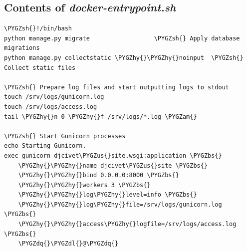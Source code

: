 \documentclass[letterpaper,10pt,english]{sphinxmanual}
\def\PYGZbs{\char`\\}
\def\PYGZus{\char`\_}
\def\PYGZam{\char`\&}
\def\PYGZsh{\char`\#}
\def\PYGZdl{\char`\$}
\def\PYGZhy{\char`\-}
\def\PYGZdq{\char`\"}
\begin{document}
\subsection{Contents of \emph{docker-entrypoint.sh}}
\label{appendix5:contents-of-docker-entrypoint-sh}
\begin{Verbatim}[commandchars=\\\{\}]
\PYGZsh{}!/bin/bash
python manage.py migrate                  \PYGZsh{} Apply database migrations
python manage.py collectstatic \PYGZhy{}\PYGZhy{}noinput  \PYGZsh{} Collect static files

\PYGZsh{} Prepare log files and start outputting logs to stdout
touch /srv/logs/gunicorn.log
touch /srv/logs/access.log
tail \PYGZhy{}n 0 \PYGZhy{}f /srv/logs/*.log \PYGZam{}

\PYGZsh{} Start Gunicorn processes
echo Starting Gunicorn.
exec gunicorn djcivet\PYGZus{}site.wsgi:application \PYGZbs{}
    \PYGZhy{}\PYGZhy{}name djcivet\PYGZus{}site \PYGZbs{}
    \PYGZhy{}\PYGZhy{}bind 0.0.0.0:8000 \PYGZbs{}
    \PYGZhy{}\PYGZhy{}workers 3 \PYGZbs{}
    \PYGZhy{}\PYGZhy{}log\PYGZhy{}level=info \PYGZbs{}
    \PYGZhy{}\PYGZhy{}log\PYGZhy{}file=/srv/logs/gunicorn.log \PYGZbs{}
    \PYGZhy{}\PYGZhy{}access\PYGZhy{}logfile=/srv/logs/access.log \PYGZbs{}
    \PYGZdq{}\PYGZdl{}@\PYGZdq{}
\end{Verbatim}
\end{document}
